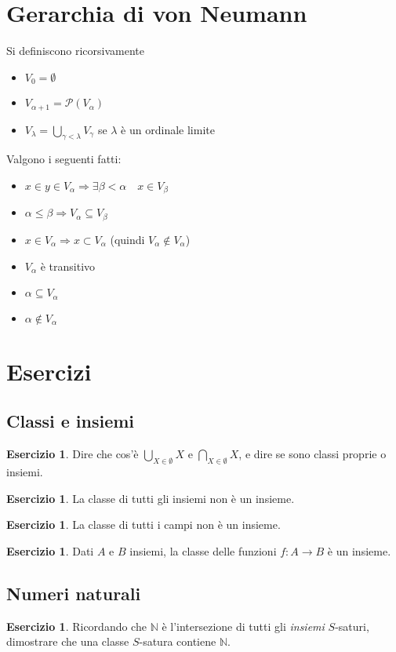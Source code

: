 \documentclass[a4paper,10pt,oneside]{article}
\theoremstyle{plain}
\theoremstyle{definition}
\newtheorem{myex}[mytheorem]{Esercizio}
\theoremstyle{remark}
\begin{document}
\section{Gerarchia di von Neumann}
Si definiscono ricorsivamente
\begin{itemize}
   \item $V_0 = \emptyset$
   \item $V_{\alpha +1}=\mathcal{P}(V_\alpha)$
   \item $V_{\lambda}=\bigcup_{\gamma<\lambda}V_\gamma$ se $\lambda$ è un ordinale limite
\end{itemize}
Valgono i seguenti fatti:
\begin{itemize}
  \item $x\in y\in V_\alpha \Rightarrow \exists \beta <\alpha \quad x \in V_\beta$
  \item $\alpha\le\beta \Rightarrow V_\alpha\subseteq V_\beta$
  \item $x\in V_\alpha \Rightarrow x \subset V_\alpha$ (quindi $V_\alpha \notin V_\alpha$)
  \item $V_\alpha$ è transitivo
  \item $\alpha \subseteq V_\alpha$
  \item $\alpha \notin V_\alpha$
\end{itemize}

\section{Esercizi}
\subsection{Classi e insiemi}
\begin{myex}
 Dire che cos'è $\bigcup_{X\in \emptyset} X$ e $\bigcap_{X\in \emptyset} X$, e dire se sono classi proprie o insiemi.
\end{myex}
\begin{myex}
 La classe di tutti gli insiemi non è un insieme.
\end{myex}
\begin{myex}
 La classe di tutti i campi non è un insieme.
\end{myex}


\begin{myex}
 Dati $A$ e $B$ insiemi, la classe delle funzioni $f: A\rightarrow B$ è un insieme.
\end{myex}

\subsection{Numeri naturali}
\begin{myex}\label{ex:classisature}
 Ricordando che $\mathbb N$ è l'intersezione di tutti gli \emph{insiemi} $S$-saturi, dimostrare che una classe $S$-satura contiene $\mathbb N$.
\end{myex}
\end{document}
